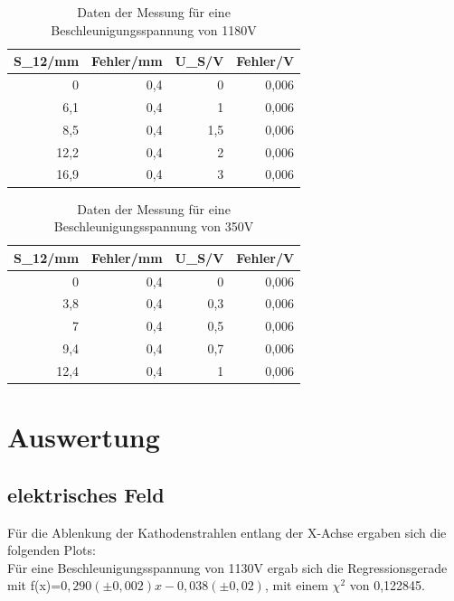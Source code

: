 \documentclass[12pt]{scrartcl}
\begin{document}
\begin{table}[htbp]
\caption{Daten der Messung für eine Beschleunigungsspannung von 1180V}
\begin{center}
\begin{tabular}{|r|r|r|r|}
\hline
\multicolumn{1}{|l|}{S\_12/mm} & \multicolumn{1}{l|}{Fehler/mm} & \multicolumn{1}{l|}{U\_S/V} & \multicolumn{1}{l|}{Fehler/V} \\ \hline
0 & 0,4 & 0 & 0,006 \\ \hline
6,1 & 0,4 & 1 & 0,006 \\ \hline
8,5 & 0,4 & 1,5 & 0,006 \\ \hline
12,2 & 0,4 & 2 & 0,006 \\ \hline
16,9 & 0,4 & 3 & 0,006 \\ \hline
\end{tabular}
\end{center}
\label{tab:materialeigenschaften}
\end{table}


\begin{table}[htbp]
\caption{Daten der Messung für eine Beschleunigungsspannung von 350V}
\begin{center}
\begin{tabular}{|r|r|r|r|}
\hline
\multicolumn{1}{|l|}{S\_12/mm} & \multicolumn{1}{l|}{Fehler/mm} & \multicolumn{1}{l|}{U\_S/V} & \multicolumn{1}{l|}{Fehler/V} \\ \hline
0 & 0,4 & 0 & 0,006 \\ \hline
3,8 & 0,4 & 0,3 & 0,006 \\ \hline
7 & 0,4 & 0,5 & 0,006 \\ \hline
9,4 & 0,4 & 0,7 & 0,006 \\ \hline
12,4 & 0,4 & 1 & 0,006 \\ \hline
\end{tabular}
\end{center}
\label{tab:materialeigenschaften}
\end{table}

\newpage

\section{Auswertung}
\subsection{elektrisches Feld}
Für die Ablenkung der Kathodenstrahlen entlang der X-Achse ergaben sich die folgenden Plots:\\
Für eine Beschleunigungsspannung von 1130V ergab sich die Regressionsgerade mit f(x)=$0,290 (\pm 0,002 ) x  - 0,038 (\pm 0,02)$, mit einem $\chi^2$ von 0,122845.
\end{document}
